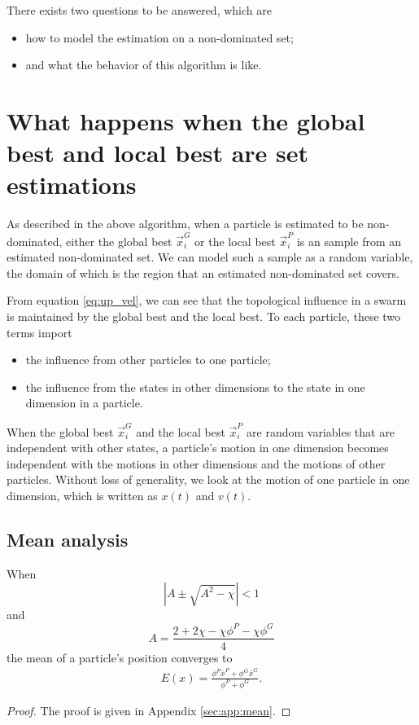 \documentclass[12pt]{article}
\begin{document}
There exists two questions to be answered, which are
\begin{itemize}
\item how to model the estimation on a non-dominated set;
\item and what the behavior of this algorithm is like.
\end{itemize}


\section{What happens when the global best and local best are set estimations}

As described in the above algorithm, when a particle is estimated to be non-dominated, either the global best $ \vec{x}^{G}_{i} $ or the local best $ \vec{x}^{P}_{i} $ is an sample from an estimated non-dominated set.
We can model such a sample as a random variable, the domain of which is the region that an estimated non-dominated set covers.

From equation \eqref{eq:up_vel}, we can see that the topological influence in a swarm is maintained by the global best and the local best.
To each particle, these two terms import
\begin{itemize}
\item the influence from other particles to one particle;
\item the influence from the states in other dimensions to the state in one dimension in a particle.
\end{itemize}
When the global best $ \vec{x}^{G}_{i} $ and the local best $ \vec{x}^{P}_{i} $ are random variables that are independent with other states, a particle's motion in one dimension becomes independent with the motions in other dimensions and the motions of other particles.
Without loss of generality, we look at the motion of one particle in one dimension, which is written as $ x(t) $ and $ v(t) $.

\subsection{Mean analysis}

\begin{thm}
\label{thm:mean_analysis}
When 
\begin{equation}
| A \pm \sqrt{A^{2} - \chi} | < 1 
\end{equation}
and
\begin{equation}
A = \frac{2 + 2 \chi - \chi \phi^{P} - \chi \phi^{G}}{4}
\end{equation}
the mean of a particle's position converges to 
\begin{equation}
\label{eq:mean_rel}
\begin{aligned}
E(x) = \frac{ \phi^{P} \bar{x}^{P} + \phi^{G} \bar{x}^{G} }{ \phi^{P} + \phi^{G} }.
\end{aligned}
\end{equation}
\begin{proof}
The proof is given in Appendix \ref{sec:app:mean}.
\end{proof}
\end{thm}
\end{document}
